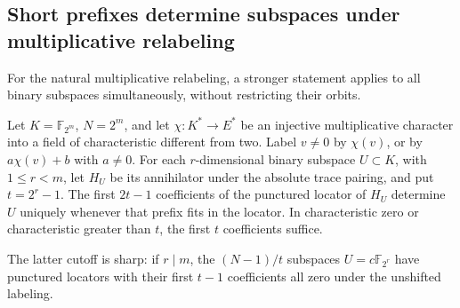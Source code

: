 \subsection*{Short prefixes determine subspaces under multiplicative relabeling}

For the natural multiplicative relabeling, a stronger statement applies
to all binary subspaces simultaneously, without restricting their orbits.

\begin{theorem}
\label{thm:multiplicative-label-rigidity}
Let $K=\mathbb F_{2^m}$, $N=2^m$, and let $\chi:K^*\to E^*$ be
an injective multiplicative character into a field of characteristic
different from two. Label $v\ne0$ by $\chi(v)$, or by
$a\chi(v)+b$ with $a\ne0$. For each $r$-dimensional binary
subspace $U\subset K$, with $1\le r<m$, let $H_U$ be its
annihilator under the absolute trace pairing, and put $t=2^r-1$.
The first $2t-1$ coefficients of the punctured locator of $H_U$
determine $U$ uniquely whenever that prefix fits in the locator.
In characteristic zero or characteristic greater than $t$, the
first $t$ coefficients suffice.

The latter cutoff is sharp: if $r\mid m$, the $(N-1)/t$ subspaces
$U=c\mathbb F_{2^r}$ have punctured locators with their first
$t-1$ coefficients all zero under the unshifted labeling.
\end{theorem}
